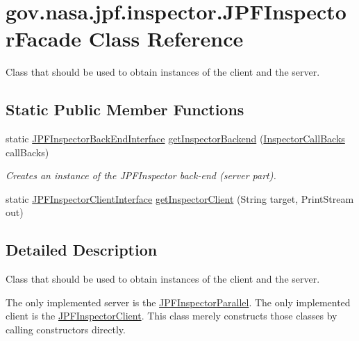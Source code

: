 \hypertarget{classgov_1_1nasa_1_1jpf_1_1inspector_1_1_j_p_f_inspector_facade}{}\section{gov.\+nasa.\+jpf.\+inspector.\+J\+P\+F\+Inspector\+Facade Class Reference}
\label{classgov_1_1nasa_1_1jpf_1_1inspector_1_1_j_p_f_inspector_facade}


Class that should be used to obtain instances of the client and the server.  


\subsection*{Static Public Member Functions}
\begin{DoxyCompactItemize}
\item 
static \hyperlink{interfacegov_1_1nasa_1_1jpf_1_1inspector_1_1interfaces_1_1_j_p_f_inspector_back_end_interface}{J\+P\+F\+Inspector\+Back\+End\+Interface} \hyperlink{classgov_1_1nasa_1_1jpf_1_1inspector_1_1_j_p_f_inspector_facade_a4b7b414f0cabacf9a7b4da6beb54e208}{get\+Inspector\+Backend} (\hyperlink{interfacegov_1_1nasa_1_1jpf_1_1inspector_1_1interfaces_1_1_inspector_call_backs}{Inspector\+Call\+Backs} call\+Backs)
\begin{DoxyCompactList}\small\item\em Creates an instance of the J\+P\+F\+Inspector back-\/end (server part). \end{DoxyCompactList}\item 
static \hyperlink{interfacegov_1_1nasa_1_1jpf_1_1inspector_1_1client_1_1_j_p_f_inspector_client_interface}{J\+P\+F\+Inspector\+Client\+Interface} \hyperlink{classgov_1_1nasa_1_1jpf_1_1inspector_1_1_j_p_f_inspector_facade_a645c51b724bc5cfeb3729ed3cbcd3d14}{get\+Inspector\+Client} (String target, Print\+Stream out)
\end{DoxyCompactItemize}


\subsection{Detailed Description}
Class that should be used to obtain instances of the client and the server. 

The only implemented server is the \hyperlink{}{J\+P\+F\+Inspector\+Parallel}. The only implemented client is the \hyperlink{}{J\+P\+F\+Inspector\+Client}. This class merely constructs those classes by calling constructors directly. 

